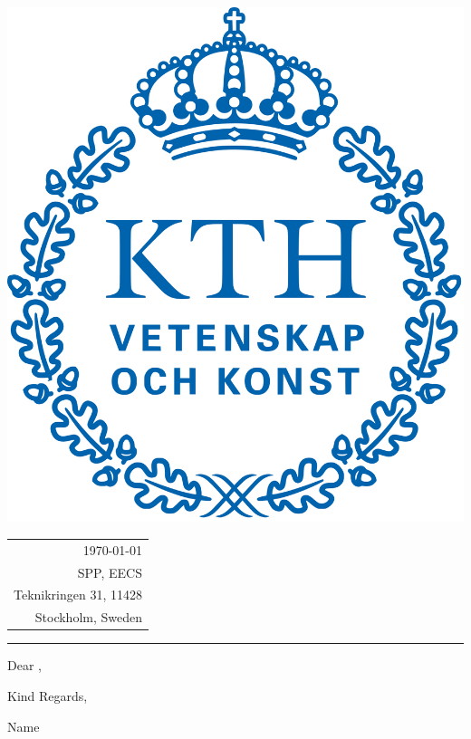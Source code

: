 \documentclass{article}
\begin{document}
\vspace*{\dimexpr-\headsep-\headheight-1pt}


\noindent \includegraphics[scale=0.07, valign=b]{Kth_logo.svg_.png} \hfill
\begin{tabular}[b]{@{}r@{}}
  \today \\[12pt] %
  SPP, EECS \\
  Teknikringen 31, 11428 \\ %
  Stockholm, Sweden
\end{tabular}

\rule{\linewidth}{1pt}

\bigskip

Dear ,

\bigskip
\setlength{\parskip}{0.5ex}

Kind Regards,

\medskip

Name
\end{document}
